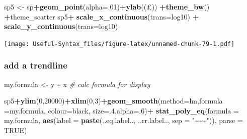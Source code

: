 \documentclass[
]{article}
\newenvironment{Shaded}{\begin{snugshade}}{\end{snugshade}}
\newcommand{\AttributeTok}[1]{\textcolor[rgb]{0.13,0.29,0.53}{#1}}
\newcommand{\CommentTok}[1]{\textcolor[rgb]{0.56,0.35,0.01}{\textit{#1}}}
\newcommand{\ConstantTok}[1]{\textcolor[rgb]{0.56,0.35,0.01}{#1}}
\newcommand{\DecValTok}[1]{\textcolor[rgb]{0.00,0.00,0.81}{#1}}
\newcommand{\FunctionTok}[1]{\textcolor[rgb]{0.13,0.29,0.53}{\textbf{#1}}}
\newcommand{\NormalTok}[1]{#1}
\newcommand{\OtherTok}[1]{\textcolor[rgb]{0.56,0.35,0.01}{#1}}
\newcommand{\SpecialCharTok}[1]{\textcolor[rgb]{0.81,0.36,0.00}{\textbf{#1}}}
\newcommand{\StringTok}[1]{\textcolor[rgb]{0.31,0.60,0.02}{#1}}
\begin{document}
\begin{Shaded}
\begin{Highlighting}[]
\NormalTok{sp5 }\OtherTok{\textless{}{-}}\NormalTok{ sp}\SpecialCharTok{+}\FunctionTok{geom\_point}\NormalTok{(}\AttributeTok{alpha=}\NormalTok{.}\DecValTok{01}\NormalTok{)}\SpecialCharTok{+}\FunctionTok{ylab}\NormalTok{(}\StringTok{\textquotesingle{}(£)\textquotesingle{}}\NormalTok{) }\SpecialCharTok{+}\FunctionTok{theme\_bw}\NormalTok{() }\SpecialCharTok{+}\NormalTok{theme\_scatter}
\NormalTok{sp5}\SpecialCharTok{+} \FunctionTok{scale\_x\_continuous}\NormalTok{(}\AttributeTok{trans=}\StringTok{\textquotesingle{}log10\textquotesingle{}}\NormalTok{) }\SpecialCharTok{+}
  \FunctionTok{scale\_y\_continuous}\NormalTok{(}\AttributeTok{trans=}\StringTok{\textquotesingle{}log10\textquotesingle{}}\NormalTok{)}
\end{Highlighting}
\end{Shaded}

\texttt{[image: Useful-Syntax\_files/figure-latex/unnamed-chunk-79-1.pdf]}

\hypertarget{add-a-trendline}{%
\subsubsection{add a trendline}\label{add-a-trendline}}

\begin{Shaded}
\begin{Highlighting}[]
\NormalTok{my.formula }\OtherTok{\textless{}{-}}\NormalTok{ y }\SpecialCharTok{\textasciitilde{}}\NormalTok{ x }\CommentTok{\# calc formula for display}

\NormalTok{sp5}\SpecialCharTok{+}\FunctionTok{ylim}\NormalTok{(}\DecValTok{0}\NormalTok{,}\DecValTok{20000}\NormalTok{)}\SpecialCharTok{+}\FunctionTok{xlim}\NormalTok{(}\DecValTok{0}\NormalTok{,}\DecValTok{3}\NormalTok{)}\SpecialCharTok{+}\FunctionTok{geom\_smooth}\NormalTok{(}\AttributeTok{method=}\StringTok{\textquotesingle{}lm\textquotesingle{}}\NormalTok{,}\AttributeTok{formula =}\NormalTok{my.formula,}
                                        \AttributeTok{colour=}\StringTok{\textquotesingle{}black\textquotesingle{}}\NormalTok{, }\AttributeTok{size=}\NormalTok{.}\DecValTok{4}\NormalTok{,}\AttributeTok{alpha=}\NormalTok{.}\DecValTok{6}\NormalTok{)}\SpecialCharTok{+}
  \FunctionTok{stat\_poly\_eq}\NormalTok{(}\AttributeTok{formula =}\NormalTok{ my.formula,}
               \FunctionTok{aes}\NormalTok{(}\AttributeTok{label =} \FunctionTok{paste}\NormalTok{(..eq.label.., ..rr.label..,}
                                                        \AttributeTok{sep =} \StringTok{"\textasciitilde{}\textasciitilde{}\textasciitilde{}"}\NormalTok{)), }\AttributeTok{parse =} \ConstantTok{TRUE}\NormalTok{)}
\end{Highlighting}
\end{Shaded}
\end{document}
